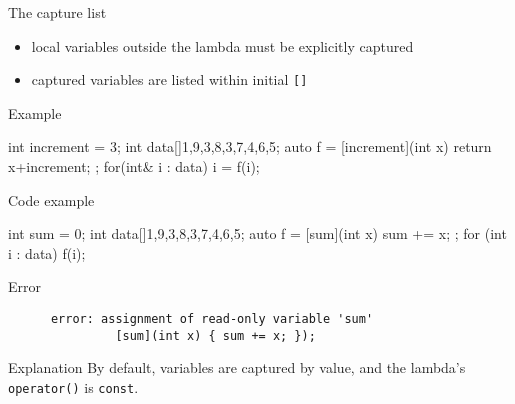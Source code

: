 \begin{frame}[fragile]
  \begin{block}{The capture list}
    \begin{itemize}
    \item local variables outside the lambda must be explicitly captured
    \item captured variables are listed within initial \texttt{[]}
    \end{itemize}
  \end{block}
  \pause
  \begin{exampleblock}{Example}
    \begin{cppcode*}{}
      int increment = 3;
      int data[]{1,9,3,8,3,7,4,6,5};
      auto f = [increment](int x) { return x+increment; };
      for(int& i : data) i = f(i);
    \end{cppcode*}
  \end{exampleblock}
\end{frame}

\begin{frame}[fragile]
  \begin{exampleblock}{Code example}
    \begin{cppcode}
      int sum = 0;
      int data[]{1,9,3,8,3,7,4,6,5};
      auto f = [sum](int x) { sum += x; };
      for (int i : data) f(i);
    \end{cppcode}
  \end{exampleblock}
  \pause
  \begin{alertblock}{Error}
    \begin{verbatim}
      error: assignment of read-only variable 'sum'
               [sum](int x) { sum += x; });
    \end{verbatim}
  \end{alertblock}
  \pause
  \begin{block}{Explanation}
    By default, variables are captured by value, and the lambda's \texttt{operator()} is \texttt{const}.
  \end{block}
\end{frame}


